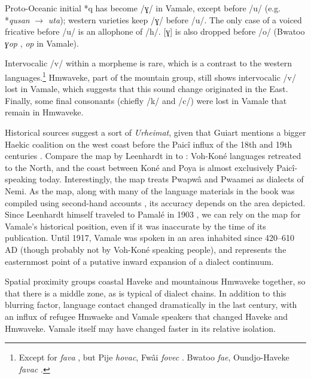 Proto-Oceanic initial *q has become /ɣ/ in Vamale, except before /u/ (e.g. *\textit{qusan}  $\rightarrow$ \textit{uta}); western varieties keep /ɣ/ before /u/. The only case of a voiced fricative before /u/ is an allophone of /h/.
[ɣ] is also dropped before /o/ (Bwatoo \textit{ɣop} , \textit{op} in Vamale).

Intervocalic /v/ within a morpheme is rare, which is a contrast to the western languages.\footnote{Except for \textit{fava} , but Pije \textit{hovac}, Fwâi \textit{fovec} \parencite[261]{haudricourt_dictionnaire_1982}. Bwatoo \textit{fae}, Oundjo-Haveke \textit{favac} \parencite[135]{rivierre_bwatoo_2006}.} Hmwaveke, part of the mountain group, still shows intervocalic /v/ lost in Vamale, which suggests that this sound change originated in the East. Finally, %
some final consonants (chiefly /k/ and /c/) were lost in Vamale that remain in Hmwaveke.

Historical sources suggest %
a sort of \textit{Urheimat}, given that Guiart mentions a bigger Haekic coalition on the west coast before the Paicî influx of the 18th and 19th centuries \parencite[131,260]{guiart_chefferie_1963}. Compare the map by Leenhardt in  to : Voh-Koné languages retreated to the North, and the coast between Koné and Poya is almost exclusively Paicî-speaking today. Interestingly, the map treats Pwapwâ and Pwaamei as dialects of Nemi. As the map, along with many of the language materials in the book was compiled using second-hand accounts \parencite[xi,xiii,xlviii]{leenhardt_langues_1946}, its accuracy depends on the area depicted. Since Leenhardt himself traveled to Pamalé in 1903 \parencite{leenhardt_figures_1978}, we can rely on the map for Vamale's historical position, even if it was inaccurate by the time of its publication. Until 1917, Vamale was spoken in an area inhabited since 420–610 AD \parencite[172]{sand_certainly_2012} (though probably not by Voh-Koné speaking people), and represents the easternmost point of a putative inward expansion of a dialect continuum. 

Spatial proximity %
groups coastal Haveke and mountainous Hmwaveke together, so that there is a middle zone, as is typical of dialect chains. In addition to this blurring factor, language contact changed dramatically in the last century, with an influx of refugee Hmwaeke and Vamale speakers that changed Haveke and Hmwaveke. Vamale itself may have changed faster in its relative isolation.

